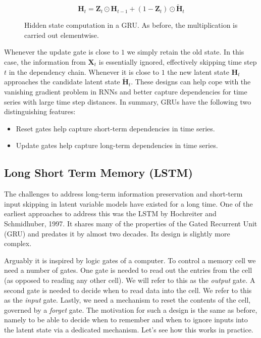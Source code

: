 $$\mathbf{H}_t = \mathbf{Z}_t \odot \mathbf{H}_{t-1}  + (1 - \mathbf{Z}_t) \odot \tilde{\mathbf{H}}_t$$

\begin{figure}[hpt]
    \centering
    
    \caption{Hidden state computation in a GRU. As before, the multiplication is carried out elementwise.}
    \label{fig:gru_3}
\end{figure}

Whenever the update gate is close to $1$ we simply retain the old state. In this case, the information from $\mathbf{X}_t$ is essentially ignored, effectively skipping time step $t$ in the dependency chain. Whenever it is close to $1$ the new latent state $\mathbf{H}_t$ approaches the candidate latent state $\tilde{\mathbf{H}}_t$. These designs can help cope with the vanishing gradient problem in RNNs and better capture dependencies for time series with large time step distances. In summary, GRUs have the following two distinguishing features:

\begin{itemize}
    \item Reset gates help capture short-term dependencies in time series.
    \item Update gates help capture long-term dependencies in time series.
\end{itemize}

\subsection{Long Short Term Memory (LSTM)}\label{subsec:lstm}

The challenges to address long-term information preservation and short-term input skipping in latent variable models have existed for a long time. One of the earliest approaches to address this was the LSTM by Hochreiter and Schmidhuber, 1997. It shares many of the properties of the Gated Recurrent Unit (GRU) and predates it by almost two decades. Its design is slightly more complex.

Arguably it is inspired by logic gates of a computer. To control a memory cell we need a number of gates. One gate is needed to read out the entries from the cell (as opposed to reading any other cell). We will refer to this as the \textit{output} gate. A second gate is needed to decide when to read data into the cell. We refer to this as the \textit{input} gate. Lastly, we need a mechanism to reset the contents of the cell, governed by a \textit{forget} gate. The motivation for such a design is the same as before, namely to be able to decide when to remember and when to ignore inputs into the latent state via a dedicated mechanism. Let’s see how this works in practice.

